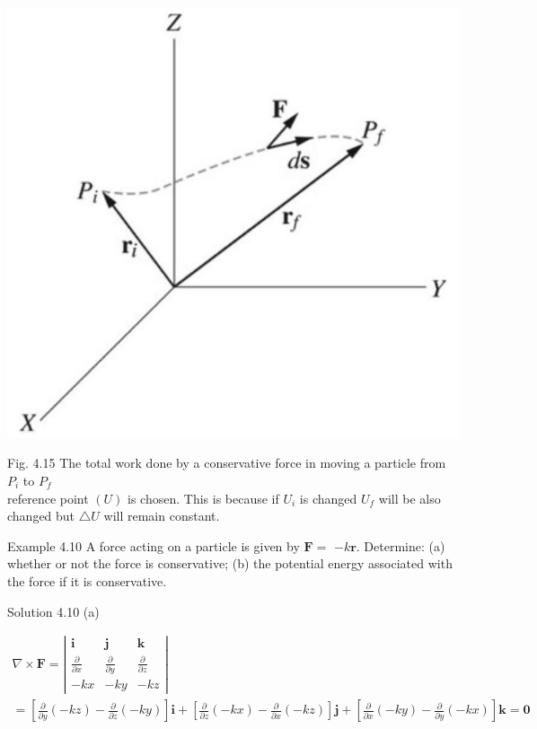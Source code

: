 \documentclass[10pt]{article}
\begin{document}
\begin{center}
\includegraphics[max width=\textwidth]{2024_09_13_db1f357d2aad0a03eb2eg-069(1)}
\end{center}

Fig. 4.15 The total work done by a conservative force in moving a particle from $P_{i}$ to $P_{f}$\\
reference point $(U)$ is chosen. This is because if $U_{i}$ is changed $U_{f}$ will be also changed but $\triangle U$ will remain constant.

Example 4.10 A force acting on a particle is given by $\mathbf{F}=$ $-k \mathbf{r}$. Determine: (a) whether or not the force is conservative; (b) the potential energy associated with the force if it is conservative.

Solution 4.10 (a)

$$
\begin{gathered}
\nabla \times \mathbf{F}=\left|\begin{array}{lll}
\mathbf{i} & \mathbf{j} & \mathbf{k} \\
\frac{\partial}{\partial x} & \frac{\partial}{\partial y} & \frac{\partial}{\partial z} \\
-k x & -k y & -k z
\end{array}\right| \\
=\left[\frac{\partial}{\partial y}(-k z)-\frac{\partial}{\partial z}(-k y)\right] \mathbf{i}+\left[\frac{\partial}{\partial z}(-k x)-\frac{\partial}{\partial x}(-k z)\right] \mathbf{j}+\left[\frac{\partial}{\partial x}(-k y)-\frac{\partial}{\partial y}(-k x)\right] \mathbf{k}=\mathbf{0}
\end{gathered}
$$
\end{document}
